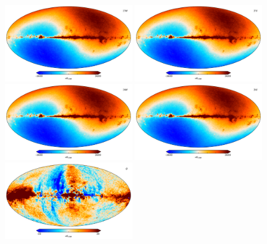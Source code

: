 \documentclass{aa}
\begin{document}
\begin{figure}[!]
  \centering
  \includegraphics[width=0.49\textwidth]{figs/map_T_27M_depol.pdf}
  \includegraphics[width=0.49\textwidth]{figs/map_T_27S_depol.pdf}\\
  \includegraphics[width=0.49\textwidth]{figs/map_T_28M_depol.pdf}
  \includegraphics[width=0.49\textwidth]{figs/map_T_28S_depol.pdf}\\
  \includegraphics[width=0.49\textwidth]{figs/map_Q_depol.pdf}

\end{figure}
\end{document}
